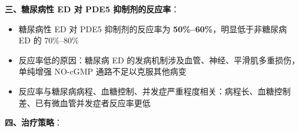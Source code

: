 \documentclass[12pt,a4paper,twoside]{ctexbook}
\begin{document}
\vspace{0.5em}
\noindent\textbf{三、糖尿病性 ED 对 PDE5 抑制剂的反应率}：

\begin{itemize}[leftmargin=2cm]
	\item 糖尿病性 ED 对 PDE5 抑制剂的反应率为 \textbf{50\%--60\%}，明显低于非糖尿病 ED 的 70\%--80\%
	\item 反应率低的原因：糖尿病 ED 的发病机制涉及血管、神经、平滑肌多重损伤，单纯增强 NO-cGMP 通路不足以克服其他病变
	\item 反应率与糖尿病病程、血糖控制、并发症严重程度相关：病程长、血糖控制差、已有微血管并发症者反应率更低
\end{itemize}

\vspace{0.5em}
\noindent\textbf{四、治疗策略}：
\end{document}
